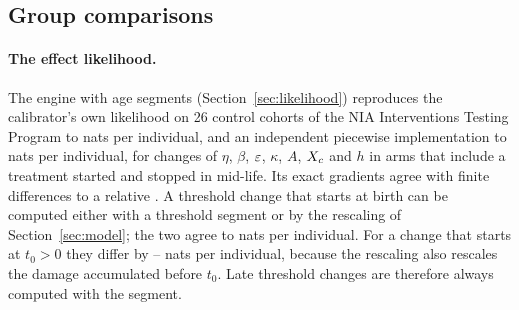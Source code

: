 \subsection{Group comparisons}\label{sec:val-effects}

\paragraph{The effect likelihood.} The engine with age segments (Section~\ref{sec:likelihood}) reproduces the
calibrator's own likelihood on 26 control cohorts of the NIA Interventions Testing Program to
 nats per individual, and an independent piecewise implementation to
 nats per individual, for changes of $\eta$, $\beta$, $\varepsilon$, $\kappa$, $A$, $X_c$ and $h$
in arms that include a treatment started and stopped in mid-life. Its exact gradients agree with finite differences to
a relative .
A threshold change that starts at birth can be computed either with a threshold segment or by the rescaling of
Section~\ref{sec:model}; the two agree to  nats per individual. For a change that starts at
$t_0>0$ they differ by -- nats per individual, because the rescaling also
rescales the damage accumulated before $t_0$. Late threshold changes are therefore always computed with the segment.

